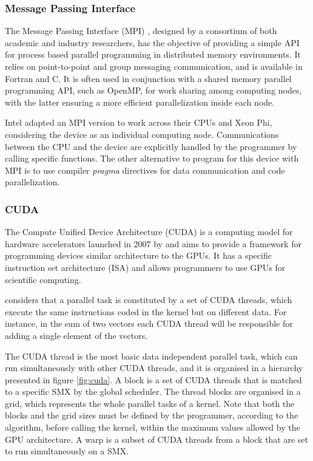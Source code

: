 \subsubsection*{Message Passing Interface}

The Message Passing Interface (MPI) \cite{MPI}, designed by a consortium of both academic and industry researchers, has the objective of providing a simple API for process based parallel programming in distributed memory environments. It relies on point-to-point and group messaging communication, and is available in Fortran and C. It is often used in conjunction with a shared memory parallel programming API, such as OpenMP, for work sharing among computing nodes, with the latter ensuring a more efficient parallelization inside each node.

Intel adapted an MPI version to work across their CPUs and Xeon Phi, considering the device as an individual computing node. Communications between the CPU and the device are explicitly handled by the programmer by calling specific functions. The other alternative to program for this device with MPI is to use compiler \textit{pragma} directives for data communication and code parallelization.

\subsubsection*{CUDA}

The Compute Unified Device Architecture (CUDA) is a computing model for hardware accelerators launched in 2007 by \nvidia and aims to provide a framework for programming devices similar architecture to the \nvidia GPUs. It has a specific instruction set architecture (ISA) and allows programmers to use GPUs for scientific computing.

\nvidia considers that a parallel task is constituted by a set of CUDA threads, which execute the same instructions coded in the kernel but on different data. For instance, in the sum of two vectors each CUDA thread will be responsible for adding a single element of the vectors.

The CUDA thread is the most basic data independent parallel task, which can run simultaneously with other CUDA threads, and it is organised in a hierarchy presented in figure \ref{fig:cuda}. A block is a set of CUDA threads that is matched to a specific SMX by the global scheduler. The thread blocks are organised in a grid, which represents the whole parallel tasks of a kernel. Note that both the blocks and the grid sizes must be defined by the programmer, according to the algorithm, before calling the kernel, within the maximum values allowed by the GPU architecture. A warp is a subset of CUDA threads from a block that are set to run simultaneously on a SMX.

